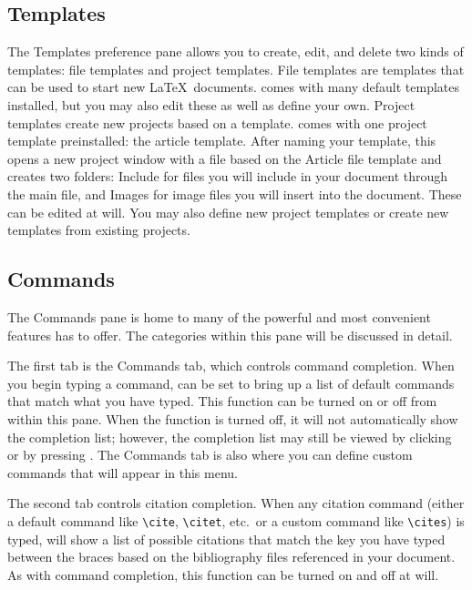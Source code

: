\subsection{Templates}
\label{reference.prefs.templates}
The Templates preference pane allows you to create, edit, and delete two kinds of templates: file templates and project templates. File templates are templates that can be used to start new \LaTeX\ documents. \texnicle comes with many default templates installed, but you may also edit these as well as define your own. Project templates create new projects based on a template. \texnicle comes with one project template preinstalled: the article template. After naming your template, this opens a new project window with a file based on the Article file template and creates two folders: \folder Include for files you will include in your document through the main file, and \folder Images for image files you will insert into the document. These can be edited at will. You may also define new project templates or create new templates from existing projects.

\subsection{Commands}
\label{reference.prefs.commands}
The Commands pane is home to many of the powerful and most convenient features \texnicle has to offer. The categories within this pane will be discussed in detail.

The first tab is the Commands tab, which controls command completion. When you begin typing a command, \texnicle can be set to bring up a list of default commands that match what you have typed. This function can be turned on or off from within this pane. When the function is turned off, it will not automatically show the completion list; however, the completion list may still be viewed by clicking  or by pressing \keys{\esckey}. The Commands tab is also where you can define custom commands that will appear in this menu.

The second tab controls citation completion. When any citation command (either a default command like \verb|\cite|, \verb|\citet|, etc.\ or a custom command like \verb|\cites|) is typed, \texnicle will show a list of possible citations that match the key you have typed between the braces based on the bibliography files referenced in your document. As with command completion, this function can be turned on and off at will.

